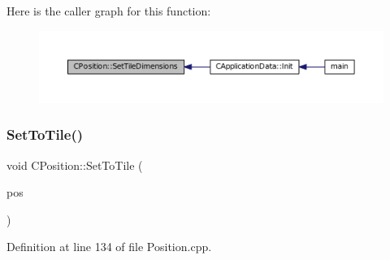 Here is the caller graph for this function\+:
\nopagebreak
\begin{figure}[H]
\begin{center}
\leavevmode
\includegraphics[width=350pt]{classCPosition_a506e9efd21e209e36533ba7e594be75f_icgraph}
\end{center}
\end{figure}
\hypertarget{classCPosition_ae302aa21792de64c97de29e2cbbfeb94}{}\label{classCPosition_ae302aa21792de64c97de29e2cbbfeb94} 
\subsubsection{\texorpdfstring{Set\+To\+Tile()}{SetToTile()}}
{\footnotesize\ttfamily void C\+Position\+::\+Set\+To\+Tile (\begin{DoxyParamCaption}\item[{const \hyperlink{classCPosition}{C\+Position} \&}]{pos }\end{DoxyParamCaption})}



Definition at line 134 of file Position.\+cpp.


